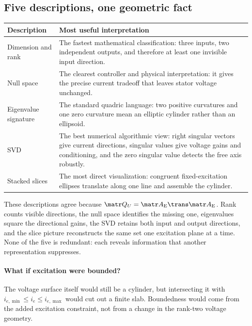

\subsection{Five descriptions, one geometric fact}

\begin{center}
\small
\begin{tabularx}{\linewidth}{@{}p{.20\linewidth}X@{}}
\toprule
Description & Most useful interpretation\\
\midrule
Dimension and rank &
The fastest mathematical classification: three inputs, two independent
outputs, and therefore at least one invisible input direction.\\
Null space &
The clearest controller and physical interpretation: it gives the precise
current tradeoff that leaves stator voltage unchanged.\\
Eigenvalue signature &
The standard quadric language: two positive curvatures and one zero curvature
mean an elliptic cylinder rather than an ellipsoid.\\
SVD &
The best numerical algorithmic view: right singular vectors give current
directions, singular values give voltage gains and conditioning, and the zero
singular value detects the free axis robustly.\\
Stacked slices &
The most direct visualization: congruent fixed-excitation ellipses translate
along one line and assemble the cylinder.\\
\bottomrule
\end{tabularx}
\end{center}

These descriptions agree because
$\Qu=\Ae\trans\Ae$.  Rank counts visible directions, the null space identifies
the missing one, eigenvalues square the directional gains, the SVD retains
both input and output directions, and the slice picture reconstructs the same
set one excitation plane at a time.  None of the five is redundant: each
reveals information that another representation suppresses.

\paragraph{What if excitation were bounded?}
The voltage surface itself would still be a cylinder, but intersecting it with
$i_{e,\min}\leq i_e\leq i_{e,\max}$ would cut out a finite slab.  Boundedness
would come from the added excitation constraint, not from a change in the
rank-two voltage geometry.
